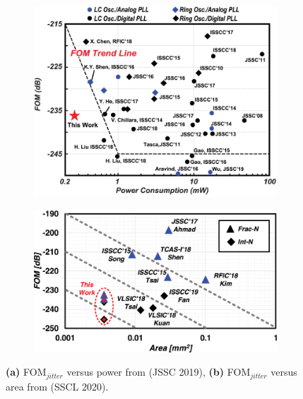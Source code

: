 	\begin{figure}[htb!]
	    \centering
	    \begin{subfigure}{0.5\textwidth}
	        \centering
	        \includegraphics[width=1\textwidth, angle=0]{./figs/liu24-fom}
	        \caption{ }
	        \label{fig:fom_v_pow}
	    \end{subfigure}%
	    \begin{subfigure}{0.5\textwidth}
	        \centering
	        \includegraphics[width=1\textwidth, angle=0]{./figs/liu_5nm}
	        \caption{ }
	        \label{fig:fom_v_area}
	    \end{subfigure}
	    \caption{\textbf{(a)} FOM$_{jitter}$ versus power from \cite{Liu2019} (JSSC 2019), \textbf{(b)} FOM$_{jitter}$ versus area from \cite{Liu2020} (SSCL 2020).}
	    \label{fig:fom_charts}
	\end{figure}


